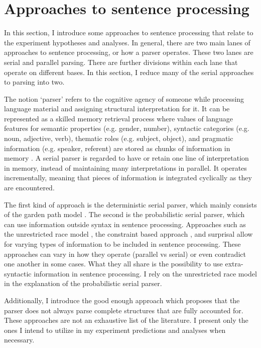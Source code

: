 \section{Approaches to sentence processing}

In this section, I introduce some approaches to sentence processing that relate to the experiment hypotheses and analyses. In general, there are two main lanes of approaches to sentence processing, or how a parser operates. These two lanes are serial and parallel parsing. There are further divisions within each lane that operate on different bases. In this section, I reduce many of the serial approaches to parsing into two.

The notion `parser' refers to the cognitive agency of someone while processing language material and assigning structural interpretation for it. It can be represented as a skilled memory retrieval process \citep{lewis2005activation} where values of language features for semantic properties (e.g. gender, number), syntactic categories (e.g. noun, adjective, verb), thematic roles (e.g. subject, object), and pragmatic information (e.g. speaker, referent) are stored as chunks of information in memory \citep{Miller1956}. A serial parser is regarded to have or retain one line of interpretation in memory, instead of maintaining many interpretations in parallel. It operates incrementally, meaning that pieces of information is integrated cyclically as they are encountered.
 
The first kind of approach is the deterministic serial parser, which mainly consists of the garden path model \citep{frazier1978sausage, frazier1987sentence}. The second is the probabilistic serial parser, which can use information outside syntax in sentence processing. Approaches such as the unrestricted race model \citep{traxler1998adjunct,van2001reanalysis, van2005evidence}, the constraint based approach \citep{MacDonald1994}, and surprisal \citep{levy2008expectation} allow for varying types of information to be included in sentence processing. These approaches can vary in how they operate (parallel vs serial) or even contradict one another in some cases. What they all share is the possibility to use extra-syntactic information in sentence processing. I rely on the unrestricted race model in the explanation of the probabilistic serial parser.

Additionally, I introduce the good enough approach \citep{ferreira2001misinterpretations, ferreira2007good} which proposes that the parser does not always parse complete structures that are fully accounted for. These approaches are not an exhaustive list of the literature. I present only the ones I intend to utilize in my experiment predictions and analyses when necessary.


